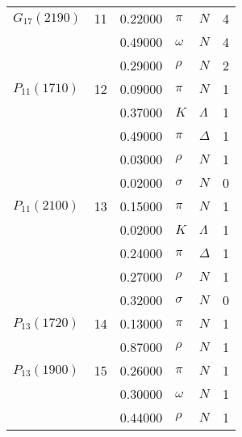 \documentclass[a4paper,10pt]{article}
\begin{document}
\begin{tabular}[t]{lrllll}
\midrule
$      G_{17}(2190)  $& 11& 0.22000&$ \pi                 $ &$ N                   $& 4\\
$                    $&   & 0.49000&$ \omega              $ &$ N                   $& 4\\
$                    $&   & 0.29000&$ \rho                $ &$ N                   $& 2\\
\midrule
$      P_{11}(1710)  $& 12& 0.09000&$ \pi                 $ &$ N                   $& 1\\
$                    $&   & 0.37000&$ K                   $ &$ \Lambda             $& 1\\
$                    $&   & 0.49000&$ \pi                 $ &$ \Delta              $& 1\\
$                    $&   & 0.03000&$ \rho                $ &$ N                   $& 1\\
$                    $&   & 0.02000&$ \sigma              $ &$ N                   $& 0\\
\midrule
$      P_{11}(2100)  $& 13& 0.15000&$ \pi                 $ &$ N                   $& 1\\
$                    $&   & 0.02000&$ K                   $ &$ \Lambda             $& 1\\
$                    $&   & 0.24000&$ \pi                 $ &$ \Delta              $& 1\\
$                    $&   & 0.27000&$ \rho                $ &$ N                   $& 1\\
$                    $&   & 0.32000&$ \sigma              $ &$ N                   $& 0\\
\midrule
$      P_{13}(1720)  $& 14& 0.13000&$ \pi                 $ &$ N                   $& 1\\
$                    $&   & 0.87000&$ \rho                $ &$ N                   $& 1\\
\midrule
$      P_{13}(1900)  $& 15& 0.26000&$ \pi                 $ &$ N                   $& 1\\
$                    $&   & 0.30000&$ \omega              $ &$ N                   $& 1\\
$                    $&   & 0.44000&$ \rho                $ &$ N                   $& 1\\
\bottomrule
\end{tabular}
\hspace*{1cm}
\end{document}
